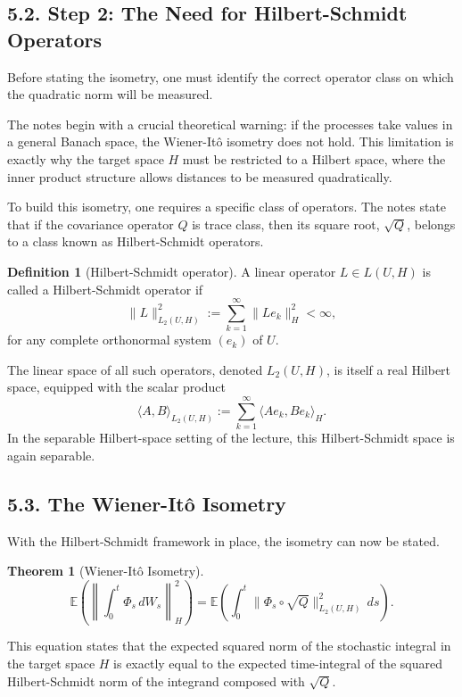 \documentclass[11pt]{article}
\theoremstyle{definition}
\newtheorem{definition}{Definition}
\newtheorem{theorem}{Theorem}
\theoremstyle{remark}
\begin{document}
\subsection*{5.2. Step 2: The Need for Hilbert-Schmidt Operators}
Before stating the isometry, one must identify the correct operator class on which the quadratic norm will be measured.

The notes begin with a crucial theoretical warning: if the processes take values in a general Banach space, the Wiener-It\^o isometry does not hold. This limitation is exactly why the target space \(H\) must be restricted to a Hilbert space, where the inner product structure allows distances to be measured quadratically.

To build this isometry, one requires a specific class of operators. The notes state that if the covariance operator \(Q\) is trace class, then its square root, \(\sqrt{Q}\), belongs to a class known as Hilbert-Schmidt operators.

\begin{definition}[Hilbert-Schmidt operator]
A linear operator \(L\in L(U,H)\) is called a Hilbert-Schmidt operator if
\[
\|L\|_{L_2(U,H)}^2:=\sum_{k=1}^{\infty}\|Le_k\|_H^2<\infty,
\]
for any complete orthonormal system \((e_k)\) of \(U\).
\end{definition}

The linear space of all such operators, denoted \(L_2(U,H)\), is itself a real Hilbert space, equipped with the scalar product
\[
\langle A,B\rangle_{L_2(U,H)}:=\sum_{k=1}^{\infty}\langle Ae_k,Be_k\rangle_H.
\]
In the separable Hilbert-space setting of the lecture, this Hilbert-Schmidt space is again separable.

\subsection*{5.3. The Wiener-It\^o Isometry}
With the Hilbert-Schmidt framework in place, the isometry can now be stated.

\begin{theorem}[Wiener-It\^o Isometry]
\[
\mathbb E\left(\left\|\int_0^t \Phi_s\,dW_s\right\|_H^2\right)
=
\mathbb E\left(\int_0^t \|\Phi_s\circ \sqrt{Q}\|_{L_2(U,H)}^2\,ds\right).
\]
\end{theorem}

This equation states that the expected squared norm of the stochastic integral in the target space \(H\) is exactly equal to the expected time-integral of the squared Hilbert-Schmidt norm of the integrand composed with \(\sqrt{Q}\).
\end{document}
